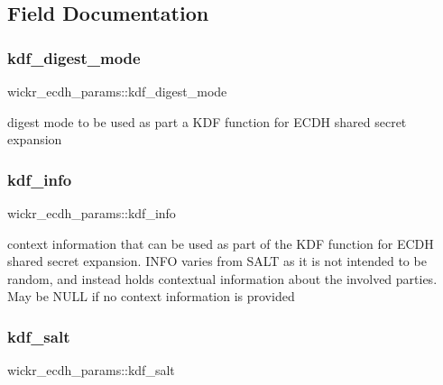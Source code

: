 \subsection{Field Documentation}
\mbox{\label{structwickr__ecdh__params_a8cffc5933efafe74e4b723516f2cd542}} 
\subsubsection{\texorpdfstring{kdf\+\_\+digest\+\_\+mode}{kdf\_digest\_mode}}
{\footnotesize\ttfamily wickr\+\_\+ecdh\+\_\+params\+::kdf\+\_\+digest\+\_\+mode}

digest mode to be used as part a K\+DF function for E\+C\+DH shared secret expansion \mbox{\label{structwickr__ecdh__params_a0259f327ae0bdcc9e44b1d43a1216cac}} 
\subsubsection{\texorpdfstring{kdf\+\_\+info}{kdf\_info}}
{\footnotesize\ttfamily wickr\+\_\+ecdh\+\_\+params\+::kdf\+\_\+info}

context information that can be used as part of the K\+DF function for E\+C\+DH shared secret expansion. I\+N\+FO varies from S\+A\+LT as it is not intended to be random, and instead holds contextual information about the involved parties. May be N\+U\+LL if no context information is provided \mbox{\label{structwickr__ecdh__params_ad7e1b337665c957189e21a2d6dfe7cd8}} 
\subsubsection{\texorpdfstring{kdf\+\_\+salt}{kdf\_salt}}
{\footnotesize\ttfamily wickr\+\_\+ecdh\+\_\+params\+::kdf\+\_\+salt}

